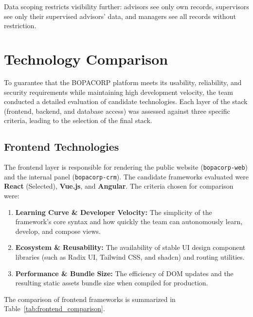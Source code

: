 \documentclass[letterpaper%
, oneside%
, 12pt%
, memoireprojet%
, english%
,creativecommons,hyperref, withAlgo2e %
]{thETS}
\begin{document}
Data scoping restricts visibility further: advisors see only own records, supervisors see only their supervised advisors' data, and managers see all records without restriction.

\section{Technology Comparison}
To guarantee that the BOPACORP platform meets its usability, reliability, and security requirements while maintaining high development velocity, the team conducted a detailed evaluation of candidate technologies. Each layer of the stack (frontend, backend, and database access) was assessed against three specific criteria, leading to the selection of the final stack.

\subsection{Frontend Technologies}
The frontend layer is responsible for rendering the public website (\texttt{bopacorp-web}) and the internal panel (\texttt{bopacorp-crm}). The candidate frameworks evaluated were \textbf{React} (Selected), \textbf{Vue.js}, and \textbf{Angular}. The criteria chosen for comparison were:
\begin{enumerate}
    \item \textbf{Learning Curve \& Developer Velocity:} The simplicity of the framework's core syntax and how quickly the team can autonomously learn, develop, and compose views.
    \item \textbf{Ecosystem \& Reusability:} The availability of stable UI design component libraries (such as Radix UI, Tailwind CSS, and shadcn) and routing utilities.
    \item \textbf{Performance \& Bundle Size:} The efficiency of DOM updates and the resulting static assets bundle size when compiled for production.
\end{enumerate}

The comparison of frontend frameworks is summarized in Table~\ref{tab:frontend_comparison}.
\end{document}
